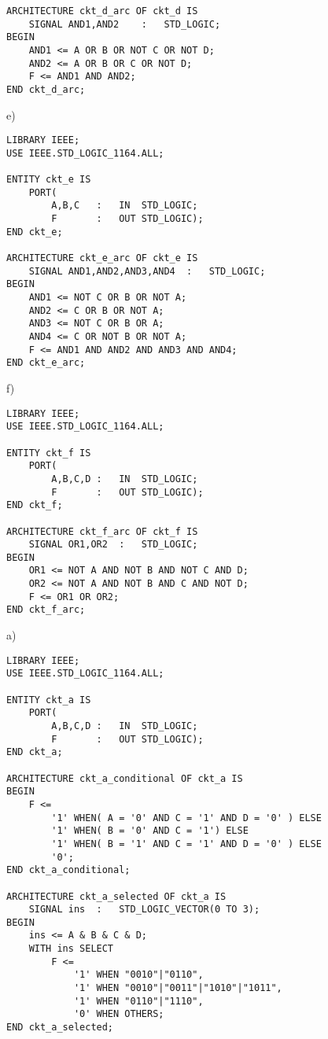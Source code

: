 \begin{enumerate}
\begin{minipage}{1\linewidth}
\begin{lstlisting}[]
ARCHITECTURE ckt_d_arc OF ckt_d IS
	SIGNAL AND1,AND2	:	STD_LOGIC;
BEGIN
	AND1 <= A OR B OR NOT C OR NOT D;
	AND2 <= A OR B OR C OR NOT D;
	F <= AND1 AND AND2;
END ckt_d_arc;
		\end{lstlisting}
	\end{minipage}

	\begin{minipage}{1\linewidth}
		e)
		\begin{lstlisting}[]
LIBRARY IEEE;
USE IEEE.STD_LOGIC_1164.ALL;

ENTITY ckt_e IS
	PORT(
		A,B,C	:	IN	STD_LOGIC;
		F		:	OUT	STD_LOGIC);
END ckt_e;

ARCHITECTURE ckt_e_arc OF ckt_e IS
	SIGNAL AND1,AND2,AND3,AND4	:	STD_LOGIC;
BEGIN
	AND1 <= NOT C OR B OR NOT A;
	AND2 <= C OR B OR NOT A;
	AND3 <= NOT C OR B OR A;
	AND4 <= C OR NOT B OR NOT A;
	F <= AND1 AND AND2 AND AND3 AND AND4;
END ckt_e_arc;
		\end{lstlisting}
	\end{minipage}

	\begin{minipage}{1\linewidth}
		f)
		\begin{lstlisting}[]
LIBRARY IEEE;
USE IEEE.STD_LOGIC_1164.ALL;

ENTITY ckt_f IS
	PORT(
		A,B,C,D	:	IN	STD_LOGIC;
		F		:	OUT	STD_LOGIC);
END ckt_f;

ARCHITECTURE ckt_f_arc OF ckt_f IS
	SIGNAL OR1,OR2	:	STD_LOGIC;
BEGIN
	OR1 <= NOT A AND NOT B AND NOT C AND D;
	OR2 <= NOT A AND NOT B AND C AND NOT D;
	F <= OR1 OR OR2;
END ckt_f_arc;
		\end{lstlisting}
	\end{minipage}
	
	\begin{minipage}{1\linewidth}
	\item a)
		\begin{lstlisting}
LIBRARY IEEE;
USE IEEE.STD_LOGIC_1164.ALL;

ENTITY ckt_a IS
	PORT(
		A,B,C,D	:	IN	STD_LOGIC;
		F		:	OUT	STD_LOGIC);
END ckt_a;

ARCHITECTURE ckt_a_conditional OF ckt_a IS
BEGIN
	F <=
		'1' WHEN( A = '0' AND C = '1' AND D = '0' ) ELSE
		'1' WHEN( B = '0' AND C = '1') ELSE
		'1' WHEN( B = '1' AND C = '1' AND D = '0' ) ELSE
		'0';
END ckt_a_conditional;

ARCHITECTURE ckt_a_selected OF ckt_a IS
	SIGNAL ins	:	STD_LOGIC_VECTOR(0 TO 3);
BEGIN
	ins <= A & B & C & D;
	WITH ins SELECT
		F <=
			'1' WHEN "0010"|"0110",
			'1' WHEN "0010"|"0011"|"1010"|"1011",
			'1' WHEN "0110"|"1110",
			'0' WHEN OTHERS;			
END ckt_a_selected;
		\end{lstlisting}
	\end{minipage}


\end{enumerate}
